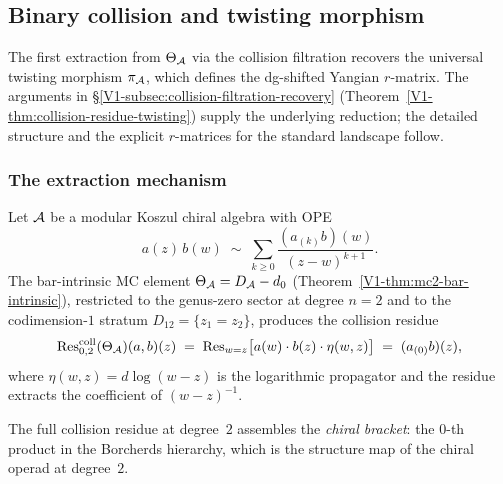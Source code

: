 \subsection{Binary collision and twisting morphism}

The first extraction from $\Theta_{\mathcal{A}}$ via the collision filtration
recovers the universal twisting morphism $\pi_{\mathcal{A}}$, which defines
the dg-shifted Yangian $r$-matrix. The arguments in
\S\ref{V1-subsec:collision-filtration-recovery}
(Theorem~\ref{V1-thm:collision-residue-twisting}) supply the
underlying reduction; the detailed structure and the explicit
$r$-matrices for the standard landscape follow.


\subsubsection{The extraction mechanism}

\begin{construction}
\label{constr:thqg-V-binary-extraction}
Let $\mathcal{A}$ be a modular Koszul chiral algebra with OPE
\begin{equation}%
a(z)\, b(w)
\;\sim\;
\sum_{k \geq 0}
\frac{(a_{(k)}b)(w)}{(z - w)^{k+1}}.
\end{equation}
The bar-intrinsic MC element $\Theta_{\mathcal{A}} = D_{\mathcal{A}} - d_0$
(Theorem~\ref*{V1-thm:mc2-bar-intrinsic}), restricted to the genus-zero
sector at degree $n = 2$ and to the codimension-$1$ stratum
$D_{12} = \{z_1 = z_2\}$, produces the collision residue
\begin{equation}%
\Rescoll_{0,2}(\Theta_\cA)(a, b)(z)
\;=\;
\Res_{w = z}
\bigl[
 a(w) \cdot b(z) \cdot \eta(w,z)
\bigr]
\;=\;
(a_{(0)}b)(z),
\end{equation}
where $\eta(w,z) = d\log(w - z)$ is the logarithmic propagator and
the residue extracts the coefficient of $(w - z)^{-1}$.

The full collision residue at degree~$2$ assembles the \emph{chiral
bracket}: the $0$-th product in the Borcherds hierarchy, which is the
structure map of the chiral operad at degree~$2$.
\end{construction}

